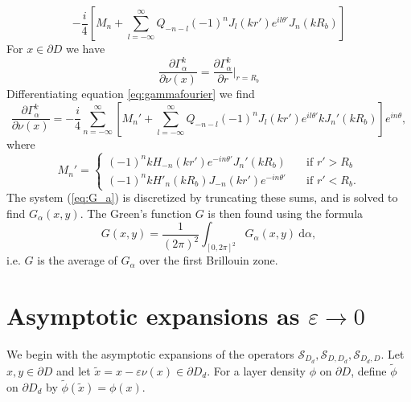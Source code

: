 \documentclass[a4paper]{article}
\theoremstyle{definition}
\renewcommand{\S}{\mathcal{S}}
\renewcommand{\epsilon}{\varepsilon}
\newcommand{\dx}{\: \mathrm{d}}
\newcommand{\eqnref}[1]{(\ref {#1})}
\begin{document}
\begin{equation*}
-\frac{i}{4}\left[M_n + \sum_{l=-\infty}^\infty Q_{-n-l} (-1)^nJ_l(kr')e^{il\theta'}J_n(kR_b)\right]
\end{equation*}
For $x\in \partial D$ we have
\begin{equation*}
\frac{\partial \Gamma_\alpha^k}{\partial \nu(x)} = \frac{\partial \Gamma_\alpha^k}{\partial r} \Bigg|_{r=R_b}
\end{equation*} 
Differentiating equation \ref{eq:gammafourier} we find
\begin{equation*}
\frac{\partial \Gamma_\alpha^k}{\partial \nu(x)} = -\frac{i}{4}\sum_{n=-\infty}^\infty\left[ M_n' + \sum_{l=-\infty}^\infty Q_{-n-l} (-1)^nJ_l(kr')e^{il\theta'}kJ_n'(kR_b)\right]e^{in\theta},
\end{equation*}
where
\begin{equation*}
M_n' = \begin{cases}
(-1)^nkH_{-n}(kr')e^{-in\theta'}J_n'(kR_b) \quad &\text{if } r' > R_b \\
(-1)^nkH'_{n}(kR_b)J_{-n}(kr')e^{-in\theta'} \quad &\text{if } r' < R_b.
\end{cases}
\end{equation*}
The system \eqnref{eq:G_a} is discretized by truncating these sums, and is solved to find $G_\alpha(x,y)$. The Green's function $G$ is then found using the formula
\begin{equation*}
G(x,y) = \frac{1}{(2\pi)^2}\int_{[0,2\pi]^2} G_\alpha(x,y) \dx \alpha,
\end{equation*}
i.e. $G$ is the average of $G_\alpha$ over the first Brillouin zone. 

\section{Asymptotic expansions as $\epsilon \rightarrow 0$}
We begin with the asymptotic expansions of the operators $\S_{D_d}, \S_{D,D_d}, \S_{D_d,D}$. Let $x,y\in \partial D$ and let $\tilde{x} = x - \epsilon \nu(x) \in \partial D_d$. For a layer density $\phi$ on $\partial D$, define $\tilde{\phi}$ on $\partial D_d$ by $\tilde{\phi}(\tilde{x}) = \phi (x)$.
\end{document}
